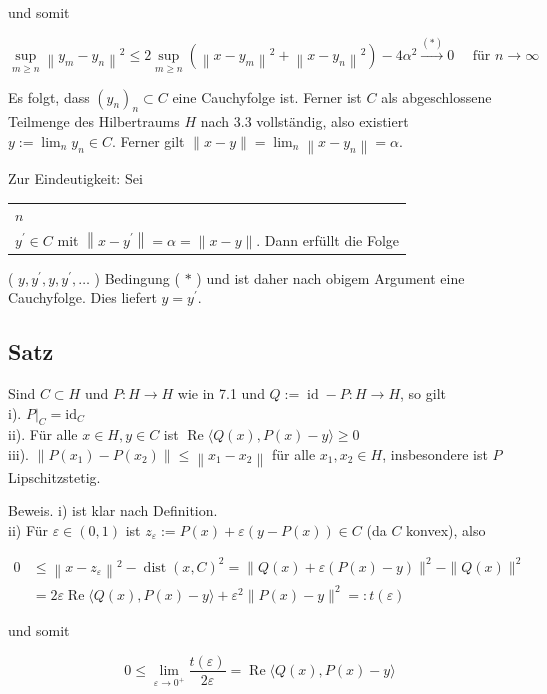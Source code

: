 \documentclass[10pt, letterpaper]{article}
\begin{document}
und somit

$$
\sup _{m \geq n}\left\|y_{m}-y_{n}\right\|^{2} \leq 2 \sup _{m \geq n}\left(\left\|x-y_{m}\right\|^{2}+\left\|x-y_{n}\right\|^{2}\right)-4 \alpha^{2} \xrightarrow{(*)} 0 \quad \text { für } n \rightarrow \infty
$$

Es folgt, dass $\left(y_{n}\right)_{n} \subset C$ eine Cauchyfolge ist. Ferner ist $C$ als abgeschlossene Teilmenge des Hilbertraums $H$ nach 3.3 vollständig, also existiert $y:=\lim _{n} y_{n} \in C$. Ferner gilt $\|x-y\|=\lim _{n}\left\|x-y_{n}\right\|=\alpha$.

Zur Eindeutigkeit: Sei \begin{tabular}{l}
$n$ \\
$y^{\prime} \in C$ mit $\left\|x-y^{\prime}\right\|=\alpha=\|x-y\|$. Dann erfüllt die Folge \\
\hline
\end{tabular} ( $y, y^{\prime}, y, y^{\prime}, \ldots$ ) Bedingung ( $*$ ) und ist daher nach obigem Argument eine Cauchyfolge. Dies liefert $y=y^{\prime}$.

\subsection*{Satz}
Sind $C \subset H$ und $P: H \rightarrow H$ wie in 7.1 und $Q:=\operatorname{id}-P: H \rightarrow H$, so gilt\\
i). $\left.P\right|_{C}=\mathrm{id}_{C}$\\
ii). Für alle $x \in H, y \in C$ ist $\operatorname{Re}\langle Q(x), P(x)-y\rangle \geq 0$\\
iii). $\left\|P\left(x_{1}\right)-P\left(x_{2}\right)\right\| \leq\left\|x_{1}-x_{2}\right\|$ für alle $x_{1}, x_{2} \in H$, insbesondere ist $P$ Lipschitzstetig.

Beweis. i) ist klar nach Definition.\\
ii) Für $\varepsilon \in(0,1)$ ist $z_{\varepsilon}:=P(x)+\varepsilon(y-P(x)) \in C$ (da $C$ konvex), also

$$
\begin{aligned}
0 & \leq\left\|x-z_{\varepsilon}\right\|^{2}-\operatorname{dist}(x, C)^{2}=\|Q(x)+\varepsilon(P(x)-y)\|^{2}-\|Q(x)\|^{2} \\
& =2 \varepsilon \operatorname{Re}\langle Q(x), P(x)-y\rangle+\varepsilon^{2}\|P(x)-y\|^{2}=: t(\varepsilon)
\end{aligned}
$$

und somit

$$
0 \leq \lim _{\varepsilon \rightarrow 0^{+}} \frac{t(\varepsilon)}{2 \varepsilon}=\operatorname{Re}\langle Q(x), P(x)-y\rangle
$$
\end{document}
